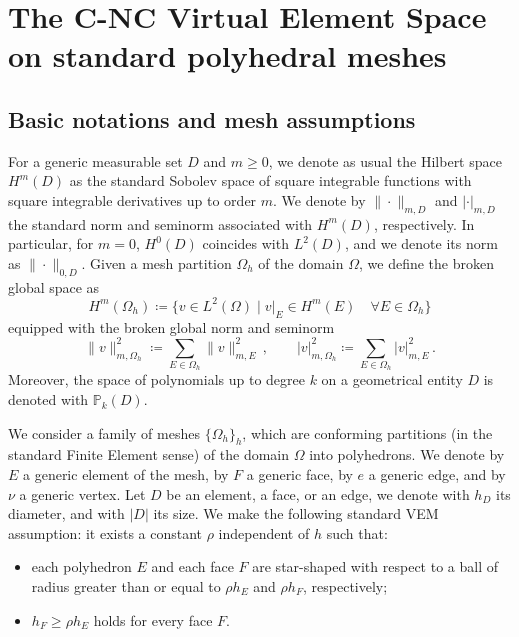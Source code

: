 \documentclass[a4paper,11pt]{article}
\theoremstyle{remark}
\theoremstyle{definition}
\begin{document}
\section{The C-NC Virtual Element Space on standard polyhedral meshes}\label{sec:1}

\subsection{Basic notations and mesh assumptions}\label{sec:mesh-ass}

For a generic measurable set $D$ and $m \geq 0$, we denote as usual the Hilbert space $H^m(D)$ as the standard Sobolev space of square integrable functions with square integrable derivatives up to order $m$. We denote by $\| \cdot \|_{m,D}$ and $| \cdot |_{m,D}$ the standard norm and seminorm associated with $H^m(D)$, respectively. In particular, for $m=0$, $H^0(D)$ coincides with $L^2(D)$, and we denote its norm as $\| \cdot \|_{0,D}$. Given a mesh partition $\Omega_h$ of the domain $\Omega$, we define the broken global space as
\[
H^m(\Omega_h) \coloneqq \{ v \in L^2(\Omega) \mid v|_E \in H^m(E) \quad \forall E \in \Omega_h \}
\]
equipped with the broken global norm and seminorm
\[
\| v \|^2_{m,\Omega_h} \coloneqq \sum_{E \in \Omega_h} \| v \|^2_{m,E} \,,
\qquad
| v |^2_{m,\Omega_h} \coloneqq \sum_{E \in \Omega_h} | v |^2_{m,E} \,.
\]
Moreover, the space of polynomials up to degree $k$ on a geometrical entity $D$ is denoted with $\mathbb P_k(D)$. \medskip 

We consider a family of meshes $\{\Omega_h\}_h$, which are conforming partitions (in the standard Finite Element sense) of the domain $\Omega$ into polyhedrons. We denote by $E$ a generic element of the mesh, by $F$ a generic face, by $e$ a generic edge, and by $\nu$ a generic vertex.
Let $D$ be an element, a face, or an edge, we denote with $h_D$ its diameter, and with $|D|$ its size.
We make the following standard VEM assumption: it exists a constant $\rho$ independent of $h$ such that: 
\begin{itemize}
\item each polyhedron $E$ and each face $F$ are star-shaped with respect to a ball of radius greater than or equal to $\rho h_E$ and $\rho h_F$, respectively;
\item $h_F \geq \rho h_E$ holds for every face $F$.
\end{itemize}
\end{document}
